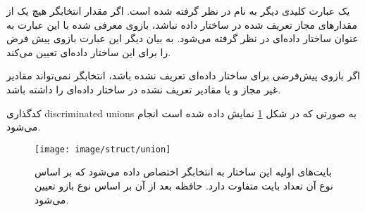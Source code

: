 یک عبارت کلیدی دیگر به نام  در نظر گرفته شده است. اگر مقدار انتخابگر
هیچ یک از مقدارهای مجاز تعریف شده در ساختار داده نباشد، بازوی معرفی شده با این
عبارت به عنوان ساختار داده‌ای در نظر گرفته می‌شود.
به بیان دیگر این عبارت بازوی پیش فرض را برای این ساختار داده‌ای تعیین می‌کند.

\begin{warning}
اگر بازوی پیش‌فرضی برای ساختار داده‌ای تعریف نشده باشد، انتخابگر نمی‌تواند
مقادیر غیر مجاز و یا مقادیر تعریف نشده در ساختار داده‌ای را داشته باشد.
\end{warning}



کدگذاری \glspl{discriminated union} به صورتی که در شکل \ref{image/struct/union} نمایش
داده شده است انجام می‌شود.


\begin{figure}
\centering
\texttt{[image: image/struct/union]}
\caption[کدگذاری یک \glspl*{discriminated union}]{
	بایت‌های اولیه این ساختار به انتخابگر اختصاص داده می‌شود که بر اساس نوع آن
	تعداد بایت متفاوت دارد. حافظه بعد از آن بر اساس نوع بازو تعیین می‌شود.
}
\label{image/struct/union}
\end{figure}




